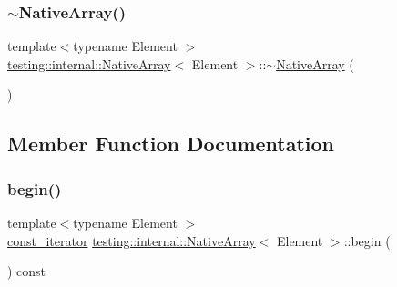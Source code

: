 \mbox{\label{classtesting_1_1internal_1_1NativeArray_a55ab5948d473a487303dcf6e02ad1f60}} 
\subsubsection{\texorpdfstring{$\sim$\+Native\+Array()}{~NativeArray()}}
{\footnotesize\ttfamily template$<$typename Element $>$ \\
\hyperlink{classtesting_1_1internal_1_1NativeArray}{testing\+::internal\+::\+Native\+Array}$<$ Element $>$\+::$\sim$\hyperlink{classtesting_1_1internal_1_1NativeArray}{Native\+Array} (\begin{DoxyParamCaption}{ }\end{DoxyParamCaption})\hspace{0.3cm}{\ttfamily [inline]}}



\subsection{Member Function Documentation}
\mbox{\label{classtesting_1_1internal_1_1NativeArray_a3046d93cfa23097e7b7c91f5f982dc78}} 
\subsubsection{\texorpdfstring{begin()}{begin()}}
{\footnotesize\ttfamily template$<$typename Element $>$ \\
\hyperlink{classtesting_1_1internal_1_1NativeArray_a9ce7c8408460d7158a2870456d134557}{const\+\_\+iterator} \hyperlink{classtesting_1_1internal_1_1NativeArray}{testing\+::internal\+::\+Native\+Array}$<$ Element $>$\+::begin (\begin{DoxyParamCaption}{ }\end{DoxyParamCaption}) const\hspace{0.3cm}{\ttfamily [inline]}}

